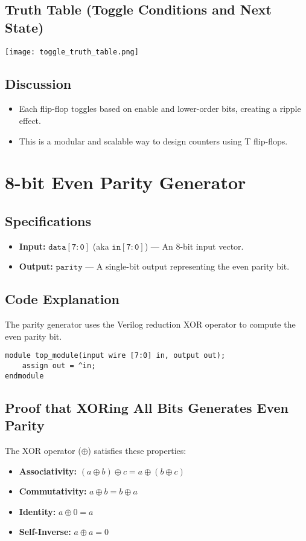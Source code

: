 \documentclass[11pt]{article}
\begin{document}
\subsection{Truth Table (Toggle Conditions and Next State)}
\begin{center}
\texttt{[image: toggle\_truth\_table.png]}
\end{center}

\subsection{Discussion}
\begin{itemize}
    \item Each flip-flop toggles based on enable and lower-order bits, creating a ripple effect.
    \item This is a modular and scalable way to design counters using T flip-flops.
\end{itemize}

\section{8-bit Even Parity Generator}

\subsection{Specifications}
\begin{itemize}
    \item \textbf{Input:} \(\mathtt{data[7:0]}\) (aka \(\mathtt{in[7:0]}\)) --- An 8-bit input vector.
    \item \textbf{Output:} \(\mathtt{parity}\) --- A single-bit output representing the even parity bit.
\end{itemize}

\subsection{Code Explanation}
The parity generator uses the Verilog reduction XOR operator to compute the even parity bit.

\begin{lstlisting}[style=verilogstyle, caption={8-bit Even Parity Generator}]
module top_module(input wire [7:0] in, output out);
    assign out = ^in;
endmodule
\end{lstlisting}

\subsection{Proof that XORing All Bits Generates Even Parity}
The XOR operator (\(\oplus\)) satisfies these properties:
\begin{itemize}
    \item \textbf{Associativity:} \((a \oplus b) \oplus c = a \oplus (b \oplus c)\)
    \item \textbf{Commutativity:} \(a \oplus b = b \oplus a\)
    \item \textbf{Identity:} \(a \oplus 0 = a\)
    \item \textbf{Self-Inverse:} \(a \oplus a = 0\)
\end{itemize}
\end{document}

